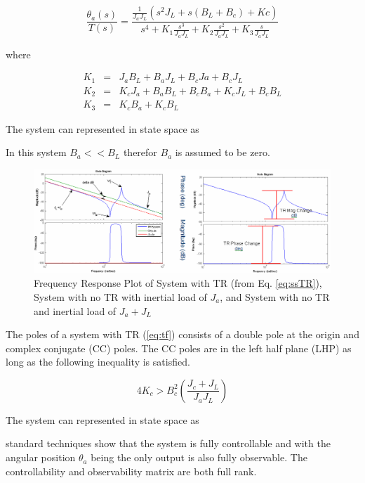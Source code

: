 \begin{equation}\label{eq:tf}
\frac{\theta_a(s)}{T(s)} = \frac{\frac{1}{J_aJ_L}(s^2J_L+s(B_L+B_c)+Kc)}{s^4 + K_1\frac{s^3}{J_aJ_L} + K_2\frac{s^2}{J_aJ_L} + K_3\frac{s}{J_aJ_L}}
\end{equation}

where


\begin{eqnarray}
K_1 & =& J_aB_L+B_aJ_L+B_cJa+B_cJ_L \\
K_2 & =& K_cJ_a + B_aB_L +B_cB_a +K_cJ_L +B_cB_L \\
K_3 & =& K_cB_a+K_cB_L
\end{eqnarray}

The system can represented in state space as

In this system $B_a << B_L$ therefor $B_a$ is assumed to be zero.






\begin{figure}[h]
  \centering
\includegraphics[width=1.0\columnwidth]{./pix/trshow.png}
  \caption{Frequency Response Plot of System with TR (from Eq. \ref{eq:ssTR}), System with no TR with
inertial load of $J_a$, and System with no TR and inertial load of $J_a+J_L$}
  \label{fig:trBode}
\end{figure}



The poles of a system with TR (\ref{eq:tf}) consists of a double pole at the origin and complex conjugate (CC) poles.  The CC poles are in the left half plane (LHP) as long as the following inequality is satisfied.

\begin{equation}
4K_c > B_c^2 \left( \frac{J_c+J_L}{J_aJ_L} \right)
\end{equation}

\noindent The system can represented in state space as


\noindent standard techniques show that the system is fully controllable and with the angular position $\theta_a$ being the only output is also fully observable.  The controllability and observability matrix are both full rank.




\cite{5686315}